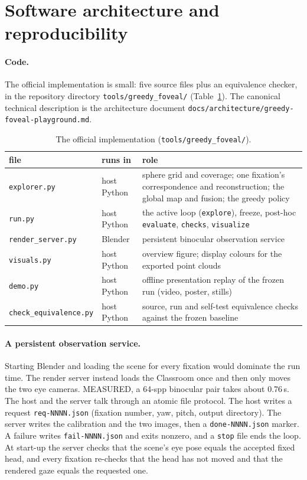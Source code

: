 \documentclass[11pt,a4paper]{article}
\newcommand{\code}[1]{\texttt{\small #1}}
\begin{document}
\section{Software architecture and reproducibility}\label{sec:software}

\paragraph{Code.} The official implementation is small: five source files plus an equivalence checker, in the
repository directory \code{tools/greedy\_foveal/} (Table~\ref{tab:software}). The canonical technical description is the
architecture document \code{docs/architecture/greedy-foveal-playground.md}.

\begin{table}[h]
\centering\small
\caption{The official implementation (\code{tools/greedy\_foveal/}).}
\label{tab:software}
\begin{tabularx}{\linewidth}{@{}l l X@{}}
\toprule
file & runs in & role \\
\midrule
\code{explorer.py} & host Python & sphere grid and coverage; one fixation's correspondence and reconstruction; the
  global map and fusion; the greedy policy \\
\code{run.py} & host Python & the active loop (\code{explore}), freeze, post-hoc \code{evaluate}, \code{checks},
  \code{visualize} \\
\code{render\_server.py} & Blender & persistent binocular observation service \\
\code{visuals.py} & host Python & overview figure; display colours for the exported point clouds \\
\code{demo.py} & host Python & offline presentation replay of the frozen run (video, poster, stills) \\
\code{check\_equivalence.py} & host Python & source, run and self-test equivalence checks against the frozen
  baseline \\
\bottomrule
\end{tabularx}
\end{table}

\paragraph{A persistent observation service.} Starting Blender and loading the scene for every fixation would dominate
the run time. The render server instead loads the Classroom once and then only moves the two eye cameras. MEASURED, a
64-spp binocular pair takes about 0.76\,s. The host and the server talk through an atomic file protocol. The host
writes a request \code{req-NNNN.json} (fixation number, yaw, pitch, output directory). The server writes the
calibration and the two images, then a \code{done-NNNN.json} marker. A failure writes \code{fail-NNNN.json} and exits
nonzero, and a \code{stop} file ends the loop. At start-up the server checks that the scene's eye pose equals the
accepted fixed head, and every fixation re-checks that the head has not moved and that the rendered gaze equals the
requested one.
\end{document}
